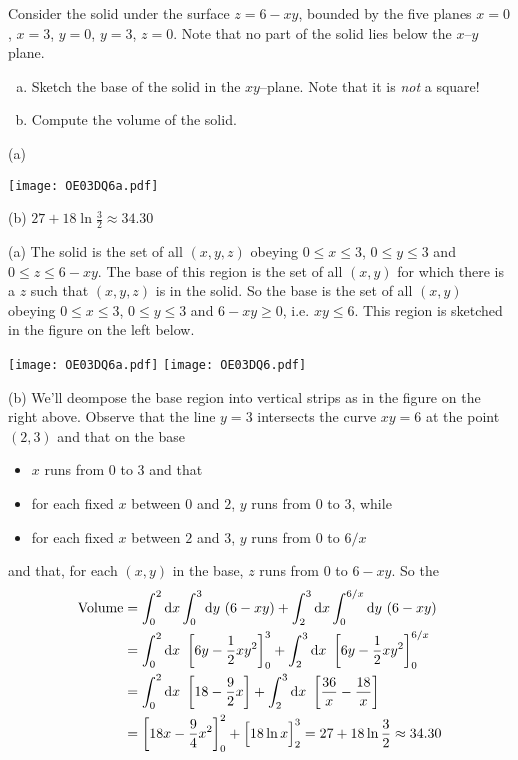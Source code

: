 \begin{question}[M200 2003D] %
Consider the solid under the surface $z=6-xy$, bounded by
the five planes $x=0$, $x=3$, $y=0$, $y=3$, $z=0$. Note that no part of
the solid lies below the $x$--$y$ plane.
\begin{enumerate}[(a)]
\item
Sketch the base of the solid in the $xy$--plane. Note that
it is \emph{not} a square!
\item
Compute the volume of the solid.
\end{enumerate}
\end{question}


\begin{answer}
(a)
\begin{center}
     \texttt{[image: OE03DQ6a.pdf]}
\end{center}

(b)
$27+18\ln\frac{3}{2}\approx 34.30$
\end{answer}

\begin{solution}
(a) The solid is the set of all $(x,y,z)$ obeying
$0\le x\le 3$, $0\le y\le 3$ and $0\le z\le 6-xy$. The base of this region
is the set of all $(x,y)$ for which there is a $z$ such that $(x,y,z)$
is in the solid. So the base is the set of all $(x,y)$ obeying
$0\le x\le 3$, $0\le y\le 3$ and $6-xy\ge 0$, i.e. $xy\le 6$. 
This region is sketched in the figure on the left below.

\begin{center}
     \texttt{[image: OE03DQ6a.pdf]} \qquad
     \texttt{[image: OE03DQ6.pdf]} 
\end{center}

(b) We'll deompose the base region into vertical strips as in the
figure on the right above.
Observe that the line $y=3$ intersects the curve $xy=6$ at the point $(2,3)$
and that on the base
\begin{itemize}
\item
$x$ runs from $0$ to $3$ and that
\item
for each fixed $x$ between $0$ and $2$, $y$ runs from $0$ to $3$, while
\item
for each fixed $x$ between $2$ and $3$, $y$ runs from $0$ to $6/x$
\end{itemize}
and that, for each $(x,y)$ in the base, $z$ runs from $0$ to $6-xy$.
So the 
\begin{align*}
\text{Volume}&=\int_0^2\mathrm{d}x\int_0^3\mathrm{d}y\ (6-xy)+
             \int_2^3\mathrm{d}x\int_0^{6/x} \mathrm{d}y\ (6-xy) \\
&=\int_0^2\mathrm{d}x\ \left[6y-\frac{1}{2} xy^2\right]_0^3
+\int_2^3\mathrm{d}x\ \left[6y-\frac{1}{2} xy^2\right]_0^{6/x} \\
&=\int_0^2\mathrm{d}x\ \left[18-\frac{9}{2}x\right]
+\int_2^3\mathrm{d}x\ \left[\frac{36}{x}-\frac{18}{x}\right] \\
&=\left[18x-\frac{9}{4}x^2\right]_0^2+\Big[18\ln x\Big]_2^3
=27+18\ln\frac{3}{2}\approx 34.30
\end{align*}
\end{solution}


